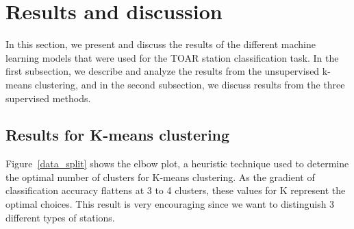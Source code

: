 \documentclass[gmd, manuscript]{copernicus}
\begin{document}
\section{Results and discussion} \label{results_discusion}
In this section, we present and discuss the results of the different  machine learning models that were used for the TOAR station classification task. In the first subsection, we describe and analyze the results from the unsupervised k-means clustering, and in the second subsection, we discuss results from the three supervised methods.
\subsection{Results for K-means clustering}
Figure~\ref{data_split} shows the elbow plot, a heuristic technique used to determine the optimal number of clusters for K-means clustering. As the gradient of classification accuracy flattens at 3 to 4 clusters, these values for K represent the optimal choices. This result is very encouraging since we want to distinguish 3 different types of stations.
\end{document}
